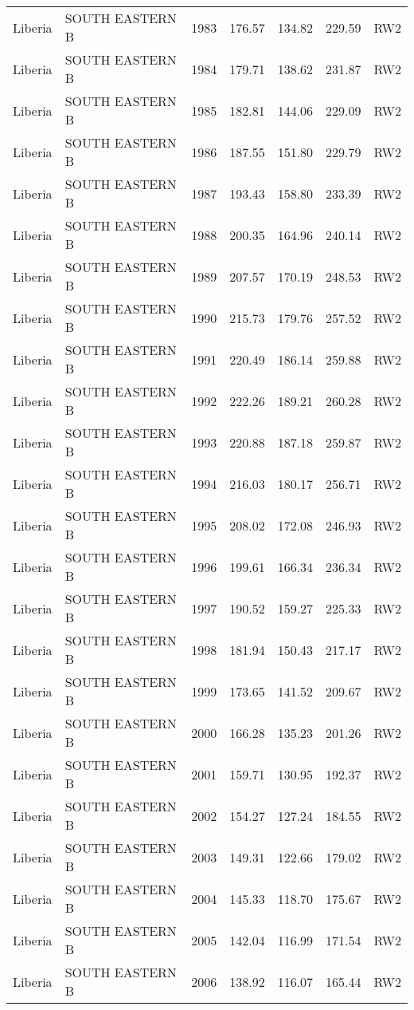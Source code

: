 \begin{longtable}{lllrrrl}
  Liberia & SOUTH EASTERN B & 1983 & 176.57 & 134.82 & 229.59 & RW2 \\ 
  Liberia & SOUTH EASTERN B & 1984 & 179.71 & 138.62 & 231.87 & RW2 \\ 
  Liberia & SOUTH EASTERN B & 1985 & 182.81 & 144.06 & 229.09 & RW2 \\ 
  Liberia & SOUTH EASTERN B & 1986 & 187.55 & 151.80 & 229.79 & RW2 \\ 
  Liberia & SOUTH EASTERN B & 1987 & 193.43 & 158.80 & 233.39 & RW2 \\ 
  Liberia & SOUTH EASTERN B & 1988 & 200.35 & 164.96 & 240.14 & RW2 \\ 
  Liberia & SOUTH EASTERN B & 1989 & 207.57 & 170.19 & 248.53 & RW2 \\ 
  Liberia & SOUTH EASTERN B & 1990 & 215.73 & 179.76 & 257.52 & RW2 \\ 
  Liberia & SOUTH EASTERN B & 1991 & 220.49 & 186.14 & 259.88 & RW2 \\ 
  Liberia & SOUTH EASTERN B & 1992 & 222.26 & 189.21 & 260.28 & RW2 \\ 
  Liberia & SOUTH EASTERN B & 1993 & 220.88 & 187.18 & 259.87 & RW2 \\ 
  Liberia & SOUTH EASTERN B & 1994 & 216.03 & 180.17 & 256.71 & RW2 \\ 
  Liberia & SOUTH EASTERN B & 1995 & 208.02 & 172.08 & 246.93 & RW2 \\ 
  Liberia & SOUTH EASTERN B & 1996 & 199.61 & 166.34 & 236.34 & RW2 \\ 
  Liberia & SOUTH EASTERN B & 1997 & 190.52 & 159.27 & 225.33 & RW2 \\ 
  Liberia & SOUTH EASTERN B & 1998 & 181.94 & 150.43 & 217.17 & RW2 \\ 
  Liberia & SOUTH EASTERN B & 1999 & 173.65 & 141.52 & 209.67 & RW2 \\ 
  Liberia & SOUTH EASTERN B & 2000 & 166.28 & 135.23 & 201.26 & RW2 \\ 
  Liberia & SOUTH EASTERN B & 2001 & 159.71 & 130.95 & 192.37 & RW2 \\ 
  Liberia & SOUTH EASTERN B & 2002 & 154.27 & 127.24 & 184.55 & RW2 \\ 
  Liberia & SOUTH EASTERN B & 2003 & 149.31 & 122.66 & 179.02 & RW2 \\ 
  Liberia & SOUTH EASTERN B & 2004 & 145.33 & 118.70 & 175.67 & RW2 \\ 
  Liberia & SOUTH EASTERN B & 2005 & 142.04 & 116.99 & 171.54 & RW2 \\ 
  Liberia & SOUTH EASTERN B & 2006 & 138.92 & 116.07 & 165.44 & RW2 \\ 

\end{longtable}
